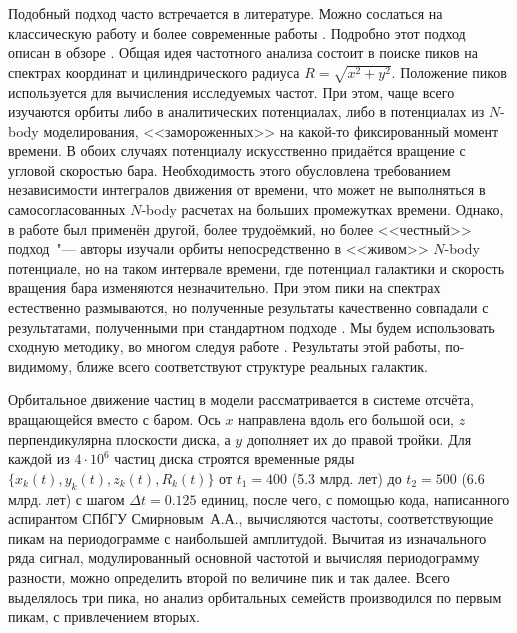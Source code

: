 \documentclass{trlnotes}
\begin{document}
Подобный подход часто встречается в литературе. Можно сослаться на классическую работу \citet{binney1982} и
более современные работы  \citep{athanassoula2002,portail2015,valluri2016}. Подробно этот подход описан в обзоре
\citet{athanassoula2013}. Общая идея частотного анализа состоит в поиске пиков на спектрах координат и
цилиндрического радиуса $R = \sqrt{x^2 + y^2}$. Положение пиков используется для  вычисления исследуемых частот.
При этом, чаще всего изучаются орбиты либо в аналитических потенциалах, либо в потенциалах из $N$-body моделирования,  <<замороженных>> на какой-то фиксированный момент времени. В обоих случаях потенциалу искусственно придаётся вращение с угловой скоростью бара. Необходимость этого обусловлена требованием независимости интегралов движения от времени, что может не выполняться в самосогласованных $N$-body расчетах на больших промежутках времени. Однако, в работе \citet{ceverino2007} был применён другой, более трудоёмкий, но более <<честный>> подход~"--- авторы изучали орбиты непосредственно в <<живом>> $N$-body потенциале, но на таком интервале времени, где потенциал галактики и скорость вращения бара изменяются незначительно. При этом пики на спектрах естественно размываются, но полученные результаты качественно совпадали с результатами, полученными при стандартном подходе \cite{athanassoula2002a}.
Мы будем использовать сходную методику, во многом следуя работе \citet{gajda2016}. Результаты этой работы, по-видимому, ближе всего соответствуют структуре реальных галактик.

Орбитальное движение частиц в модели рассматривается в системе отсчёта, вращающейся вместо с баром. Ось $x$
направлена вдоль его большой оси, $z$ перпендикулярна плоскости диска, а $y$ дополняет их до правой тройки.  Для
каждой из $4\cdot 10^6$ частиц диска строятся временные ряды $\{x_k(t), y_k(t), z_k(t), R_k(t)\}$ от $t_1=400$ (5.3
млрд. лет) до $t_2=500$ (6.6 млрд. лет) с шагом $Δt = 0.125$ единиц, после чего, с помощью кода, написанного аспирантом СПбГУ Смирновым~А.А., вычисляются частоты, соответствующие пикам на периодограмме с наибольшей амплитудой. Вычитая из изначального ряда сигнал, модулированный основной частотой и
вычисляя периодограмму разности, можно определить второй по величине пик и так далее. Всего выделялось три пика, но анализ орбитальных семейств производился по первым пикам, с привлечением вторых.
\end{document}
